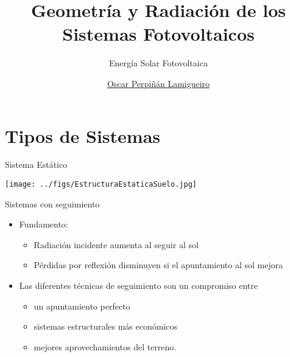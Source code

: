 \documentclass[aspectratio=169, usenames,svgnames,dvipsnames]{beamer}
\author{\href{https://oscarperpinan.github.io}{Oscar Perpiñán Lamigueiro}}
\date{}
\title{Geometría y Radiación de los Sistemas Fotovoltaicos}
\subtitle{Energía Solar Fotovoltaica}
\institute[UPM]{Universidad Politécnica de Madrid}
\begin{document}
\maketitle

\section{Tipos de Sistemas}
\label{sec:org1991092}
\begin{frame}[label={sec:org2f629b8}]{Sistema Estático}
\begin{center}
\texttt{[image: ../figs/EstructuraEstaticaSuelo.jpg]}
\end{center}
\end{frame}

\begin{frame}[label={sec:orgf724879}]{Sistemas con seguimiento}
\begin{itemize}
\item \alert{Fundamento:}
\begin{itemize}
\item Radiación incidente aumenta al seguir al sol

\item Pérdidas por reflexión disminuyen si el apuntamiento al sol mejora
\end{itemize}

\item Las diferentes técnicas de seguimiento son un \alert{compromiso} entre

\begin{itemize}
\item un \alert{apuntamiento perfecto}

\item \alert{sistemas estructurales más económicos}

\item mejores \alert{aprovechamientos del terreno}.
\end{itemize}
\end{itemize}
\end{frame}
\end{document}
